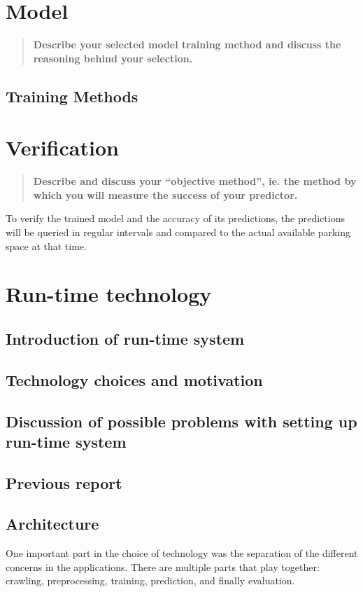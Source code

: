 \documentclass[journal,10pt]{IEEEtran}
\newcommand{\subtask}[1]{\begin{quote}\textbf{#1}\end{quote}}
\begin{document}
\section{Model}
\subtask{Describe your selected model training method and discuss the reasoning behind your selection.}
\subsection{Training Methods} 

\section{Verification}
\subtask{Describe and discuss your ``objective method'', ie. the method by which you will measure the success of your predictor.}
To verify the trained model and the accuracy of its predictions, the predictions will be queried in regular intervals and compared to the actual available parking space at that time. 

%
%


\section{Run-time technology}

\subsection{Introduction of run-time system}

\subsection{Technology choices and motivation}

\subsection{Discussion of possible problems with setting up run-time system}

\subsection{Previous report}

%
%

\subsection{Architecture}\label{sec:architecture}
One important part in the choice of technology was the separation of the different concerns in the applications. There are multiple parts that play together: crawling, preprocessing, training, prediction, and finally evaluation. 
\end{document}
